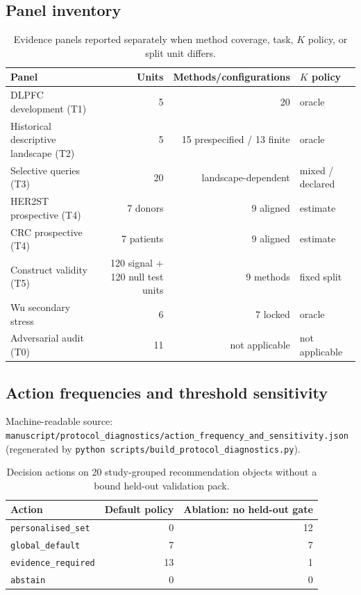 \documentclass[11pt]{article}
\begin{document}
\subsection{Panel inventory}

\begin{table}[ht]
\centering
\caption{Evidence panels reported separately when method coverage, task,
\(K\) policy, or split unit differs.
\label{tab:coverage}}
\begin{tabular}{@{}lrrl@{}}
\toprule
Panel & Units & Methods/configurations & \(K\) policy \\
\midrule
DLPFC development (T1) & 5 & 20 & oracle \\
Historical descriptive landscape (T2) & 5 & 15 prespecified / 13 finite & oracle \\
Selective queries (T3) & 20 & landscape-dependent & mixed / declared \\
HER2ST prospective (T4) & 7 donors & 9 aligned & estimate \\
CRC prospective (T4) & 7 patients & 9 aligned & estimate \\
Construct validity (T5) & 120 signal + 120 null test units & 9 methods & fixed split \\
Wu secondary stress & 6 & 7 locked & oracle \\
Adversarial audit (T0) & 11 & not applicable & not applicable \\
\bottomrule
\end{tabular}
\end{table}

\subsection{Action frequencies and threshold sensitivity}

Machine-readable source:
\texttt{manuscript/protocol\_diagnostics/action\_frequency\_and\_sensitivity.json}
(regenerated by \texttt{python scripts/build\_protocol\_diagnostics.py}).

\begin{table}[ht]
\centering
\caption{Decision actions on 20 study-grouped recommendation objects without a
bound held-out validation pack.
\label{tab:si-actions}}
\begin{tabular}{@{}lrr@{}}
\toprule
Action & Default policy & Ablation: no held-out gate \\
\midrule
\texttt{personalised\_set} & 0 & 12 \\
\texttt{global\_default} & 7 & 7 \\
\texttt{evidence\_required} & 13 & 1 \\
\texttt{abstain} & 0 & 0 \\
\bottomrule
\end{tabular}
\end{table}
\end{document}
